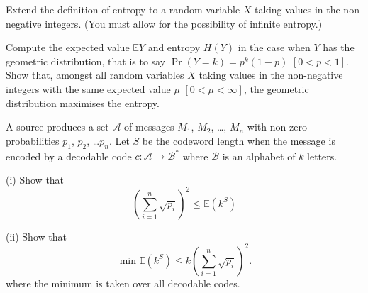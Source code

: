 \begin{question}\label{C1.14} Extend the definition of entropy to
a random variable $X$ taking values in the non-negative
integers. (You must allow for the possibility
of infinite entropy.) 

Compute the expected value ${\mathbb E}Y$ and
entropy $H(Y)$ in the case when $Y$ has the geometric
distribution, that is to say 
$\Pr(Y=k)=p^{k}(1-p)$
$[0<p<1]$. Show that, amongst all random variables 
$X$ taking values in the non-negative
integers with the same expected value $\mu$ $[0<\mu<\infty]$,
the geometric distribution maximises the entropy.
\end{question}
\begin{question}\label{C1.15} A source produces a set ${\mathcal A}$
of messages 
$M_{1}$, $M_{2}$,
\dots, $M_{n}$ with non-zero probabilities $p_{1}$, $p_{2}$,
\dots $p_{n}$. Let $S$ be the codeword length when the message
is encoded by a decodable code $c:{\mathcal A}\rightarrow{\mathcal B}^{*}$ 
where ${\mathcal B}$ is an alphabet of $k$ letters.

(i) Show that
\[\left(\sum_{i=1}^{n}\sqrt{p_{i}}\right)^{2}
\leq {\mathbb E}(k^{S})\]

\noindent[Hint: Cauchy--Schwarz,
$p_{i}^{1/2}=p_{i}^{1/2}k^{s_{i}/2}k^{-s_{i}/2}$.]

(ii) Show that
\[\min{\mathbb E}(k^{S})\leq
k\left(\sum_{i=1}^{n}\sqrt{p_{i}}\right)^{2}.\]
where the minimum is taken over all decodable codes.

\noindent[Hint: Look for a code with codeword lengths
$s_{i}=\lceil -\log_{k} p_{i}^{1/2}/\lambda\rceil$ for
an appropriate $\lambda$.]
\end{question}
\newpage
